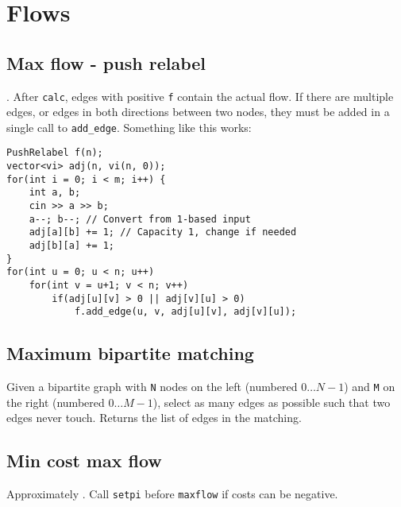 \section{Flows}

\subsection{Max flow - push relabel}
. After \verb|calc|, edges with positive \verb|f| contain the actual flow.
\warning If there are multiple edges, or edges in both directions between two nodes, they must be added in a single call to \texttt{add\_edge}.
Something like this works:
\begin{lstlisting}
PushRelabel f(n);
vector<vi> adj(n, vi(n, 0));
for(int i = 0; i < m; i++) {
	int a, b;
	cin >> a >> b;
	a--; b--; // Convert from 1-based input
	adj[a][b] += 1; // Capacity 1, change if needed
	adj[b][a] += 1;
}
for(int u = 0; u < n; u++)
	for(int v = u+1; v < n; v++)
		if(adj[u][v] > 0 || adj[v][u] > 0)
			f.add_edge(u, v, adj[u][v], adj[v][u]);
\end{lstlisting}


\subsection{Maximum bipartite matching}
Given a bipartite graph with \verb|N| nodes on the left (numbered $0 \ldots N-1$) and \verb|M| on the right (numbered $0 \ldots M-1$), select as many edges as possible such that two edges never touch. Returns the list of edges in the matching.


\subsection{Min cost max flow}
Approximately . Call \texttt{setpi} before \texttt{maxflow} if costs can be negative.

